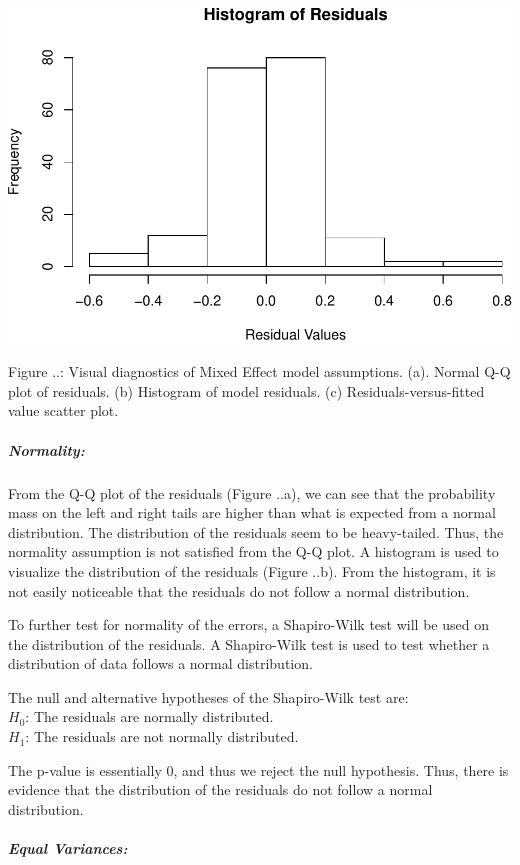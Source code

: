 \documentclass[]{article}
\let\oldsubparagraph\subparagraph
\renewcommand{\subparagraph}[1]{\oldsubparagraph{#1}\mbox{}}
\begin{document}
\includegraphics{Project3_Rongkui_files/figure-latex/unnamed-chunk-20-1.pdf}

Figure ..: Visual diagnostics of Mixed Effect model assumptions. (a).
Normal Q-Q plot of residuals. (b) Histogram of model residuals. (c)
Residuals-versus-fitted value scatter plot.

\hypertarget{normality}{%
\subparagraph{Normality:}\label{normality}}

From the Q-Q plot of the residuals (Figure ..a), we can see that the
probability mass on the left and right tails are higher than what is
expected from a normal distribution. The distribution of the residuals
seem to be heavy-tailed. Thus, the normality assumption is not satisfied
from the Q-Q plot. A histogram is used to visualize the distribution of
the residuals (Figure ..b). From the histogram, it is not easily
noticeable that the residuals do not follow a normal distribution.

To further test for normality of the errors, a Shapiro-Wilk test will be
used on the distribution of the residuals. A Shapiro-Wilk test is used
to test whether a distribution of data follows a normal distribution.

The null and alternative hypotheses of the Shapiro-Wilk test are:\\
\(H_0\): The residuals are normally distributed.\\
\(H_1\): The residuals are not normally distributed.

The p-value is essentially 0, and thus we reject the null hypothesis.
Thus, there is evidence that the distribution of the residuals do not
follow a normal distribution.

\hypertarget{equal-variances}{%
\subparagraph{Equal Variances:}\label{equal-variances}}
\end{document}
